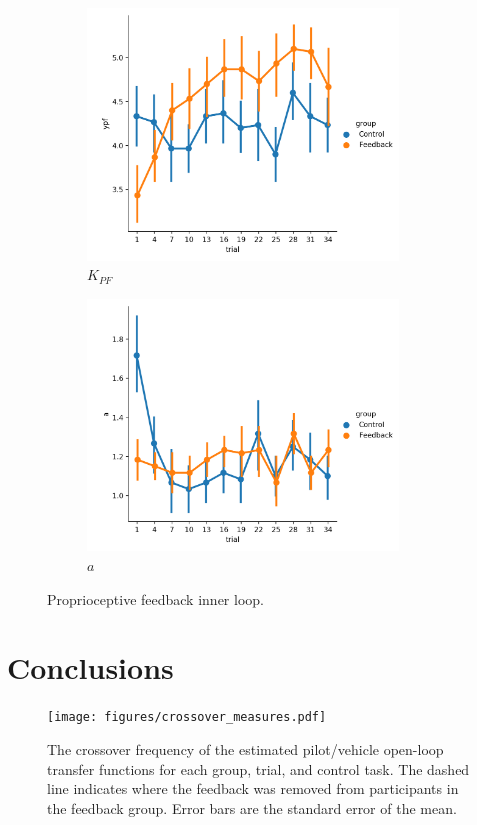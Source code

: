 \begin{figure}[t]
    \centering
    \begin{subfigure}[h]{0.49\textwidth}
        \centering
        \includegraphics[width=3.25in]{figures/ypf.png}
        \caption{$K_{PF}$}
        \label{fig:sm_ypf}
    \end{subfigure}
    \hfill
    \begin{subfigure}[h]{0.49\textwidth}
        \centering
        \includegraphics[width=3.25in]{figures/a.png}
        \caption{$a$}
        \label{fig:sm_a}
    \end{subfigure}
    \caption{Proprioceptive feedback inner loop.}
\end{figure}

\clearpage
\section{Conclusions}

\begin{figure}
\centering
\texttt{[image: figures/crossover\_measures.pdf]}
\caption{The crossover frequency of the estimated pilot/vehicle open-loop transfer functions for each group, trial, and control task.
The dashed line indicates where the feedback was removed from participants in the feedback group.
Error bars are the standard error of the mean.}
\label{figure:crossover_frequency_all}
\end{figure}

